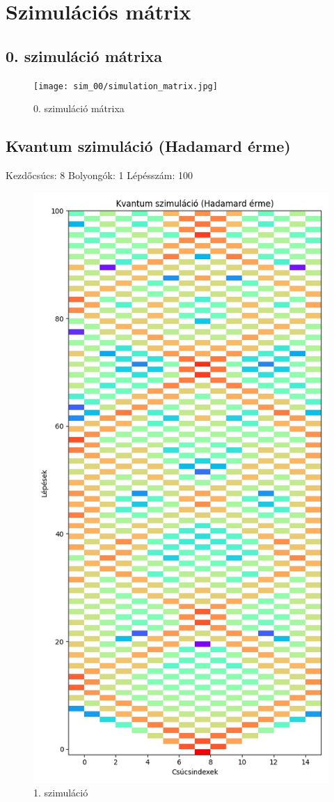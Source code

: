 \documentclass[14pt,a4paper]{article}
\begin{document}
\section{Szimulációs mátrix}
\subsection{0. szimuláció mátrixa}
\begin{figure}[H]
\centering
\texttt{[image: sim\_00/simulation\_matrix.jpg]}
\caption{0. szimuláció mátrixa}
\end{figure}
\subsection{Kvantum szimuláció (Hadamard érme)}
Kezdőcsúcs: 8
Bolyongók: 1
Lépésszám: 100
\begin{figure}[H]
\centering
\includegraphics[width = 0.7\columnwidth]{sim_01/counts.jpg}
\caption{1. szimuláció}
\end{figure}
\end{document}
